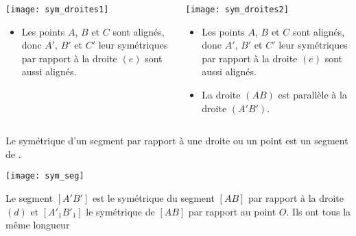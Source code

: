 \documentclass[xcolor={dvipsnames}]{beamer}
\begin{document}
\begin{frame}
	\begin{myexs}
		\begin{columns}
			\begin{column}{0.5\textwidth}
				
			
			\begin{center}
				\texttt{[image: sym\_droites1]}
			\end{center}
			
			\begin{itemize}
				\item Les points $A$, $B$ et $C$ sont alignés, donc $A'$, $B'$ et $C'$ leur symétriques par rapport à la droite $(e)$ sont \pause aussi alignés.
			\end{itemize}	
			
			\end{column}
		
			\begin{column}{0.5\textwidth}
			\begin{center}
				\texttt{[image: sym\_droites2]}\pause
			\end{center}
			
			\begin{itemize}
				\item Les points $A$, $B$ et $C$ sont alignés, donc $A'$, $B'$ et $C'$ leur symétriques par rapport à la droite $(e)$ sont aussi alignés.\pause
				\item La droite $(AB)$ est parallèle à la droite $(A'B')$.
			\end{itemize}
			\end{column}
		\end{columns}
	\end{myexs}
\end{frame}

\begin{frame}
	\begin{myprop}
		Le symétrique d'un segment par rapport à une droite ou un point est un segment de . 
	\end{myprop}
	
	\begin{myex}
		\begin{center}
			\texttt{[image: sym\_seg]}
		\end{center}
		
		Le segment $[A'B']$ est le symétrique du segment $[AB]$ par rapport à la droite $(d)$ et $[A'_1B'_1]$ le symétrique de $[AB]$ par rapport au point $O$. \pause
		Ils ont tous la même longueur
		
		
	\end{myex}
\end{frame}
\end{document}
